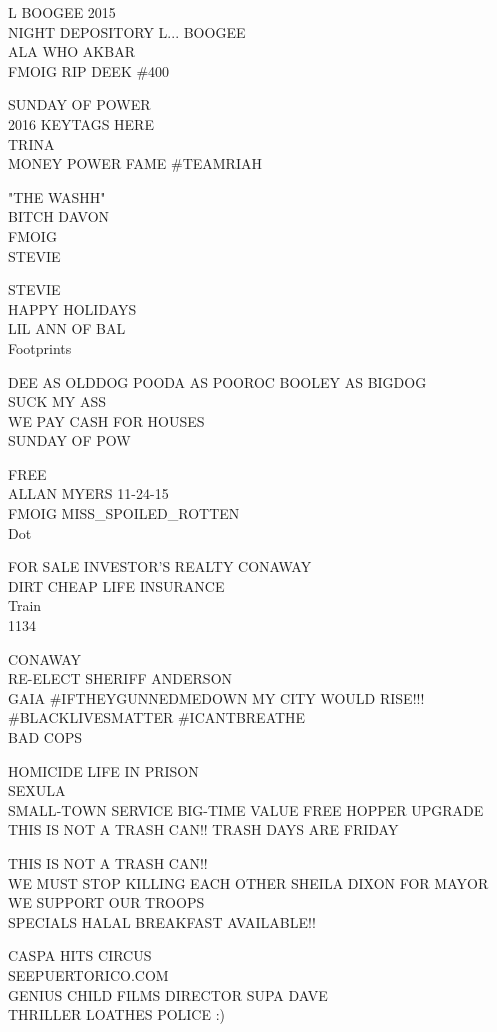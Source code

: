 \documentclass[10pt,letterpaper]{article}
\begin{document}
L BOOGEE 2015\\
NIGHT DEPOSITORY L... BOOGEE\\
ALA WHO AKBAR\\
FMOIG RIP DEEK \#400

SUNDAY OF POWER\\
2016 KEYTAGS HERE\\
TRINA\\
MONEY POWER FAME \#TEAMRIAH

"THE WASHH"\\
BITCH DAVON\\
FMOIG\\
STEVIE

STEVIE\\
HAPPY HOLIDAYS\\
LIL ANN OF BAL\\
Footprints

DEE AS OLDDOG POODA AS POOROC BOOLEY AS BIGDOG\\
SUCK MY ASS\\
WE PAY CASH FOR HOUSES\\
SUNDAY OF POW

FREE\\
ALLAN MYERS 11{-}24{-}15\\
FMOIG MISS\_SPOILED\_ROTTEN\\
Dot

FOR  SALE INVESTOR'S REALTY CONAWAY\\
DIRT CHEAP LIFE INSURANCE\\
Train\\
1134

CONAWAY\\
RE{-}ELECT SHERIFF ANDERSON\\
GAIA \#IFTHEYGUNNEDMEDOWN MY CITY WOULD RISE!!! \#BLACKLIVESMATTER \#ICANTBREATHE\\
BAD COPS

HOMICIDE LIFE IN PRISON\\
SEXULA\\
SMALL{-}TOWN SERVICE BIG{-}TIME VALUE FREE HOPPER UPGRADE\\
THIS IS NOT A TRASH CAN!!  TRASH DAYS ARE FRIDAY

THIS IS NOT A TRASH CAN!!\\
WE MUST STOP KILLING EACH OTHER SHEILA DIXON FOR MAYOR\\
WE SUPPORT OUR TROOPS\\
SPECIALS HALAL BREAKFAST AVAILABLE!!

CASPA HITS CIRCUS\\
SEEPUERTORICO.COM\\
GENIUS CHILD FILMS DIRECTOR SUPA DAVE\\
THRILLER LOATHES POLICE :)
\end{document}
